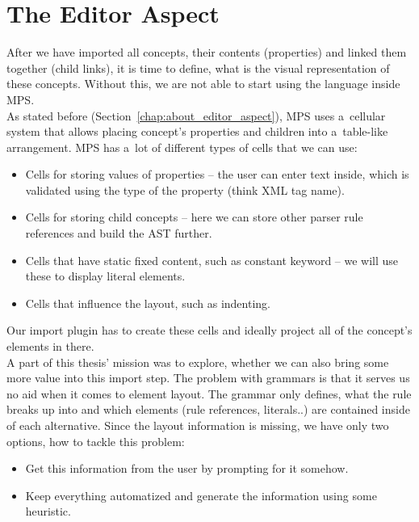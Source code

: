 \section{The Editor Aspect}
\label{chap:editor_aspect}

After we have imported all concepts, their contents (properties) and linked them together (child links), it is time to define, what is the visual representation of these concepts.
Without this, we are not able to start using the language inside MPS.
\\

As stated before (Section~\ref{chap:about_editor_aspect}), MPS uses a~cellular system that allows placing concept's properties and children into a~table-like arrangement.
MPS has a~lot of different types of cells that we can use:

\begin{itemize}
	\item Cells for storing values of properties -- the user can enter text inside, which is validated using the type of the property (think XML tag name).

	\item Cells for storing child concepts -- here we can store other parser rule references and build the AST further.

	\item Cells that have static fixed content, such as constant keyword -- we will use these to display literal elements.

	\item Cells that influence the layout, such as indenting.
\end{itemize}

Our import plugin has to create these cells and ideally project all of the concept's elements in there.
\\

A part of this thesis' mission was to explore, whether we can also bring some more value into this import step.
The problem with grammars is that it serves us no aid when it comes to element layout.
The grammar only defines, what the rule breaks up into and which elements (rule references, literals..) are contained inside of each alternative.
Since the layout information is missing, we have only two options, how to tackle this problem:

\begin{itemize}
	\item Get this information from the user by prompting for it somehow.
	\item Keep everything automatized and generate the information using some heuristic.
\end{itemize}

